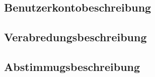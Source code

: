 \documentclass[parskip=full,11pt]{scrartcl}
\begin{document}
\subsection{Benutzerkontobeschreibung}\label{sec:accountdesc}

\subsection{Verabredungsbeschreibung}\label{sec:eventdesc}

\subsection{Abstimmugsbeschreibung}\label{sec:polldesc}
\end{document}

